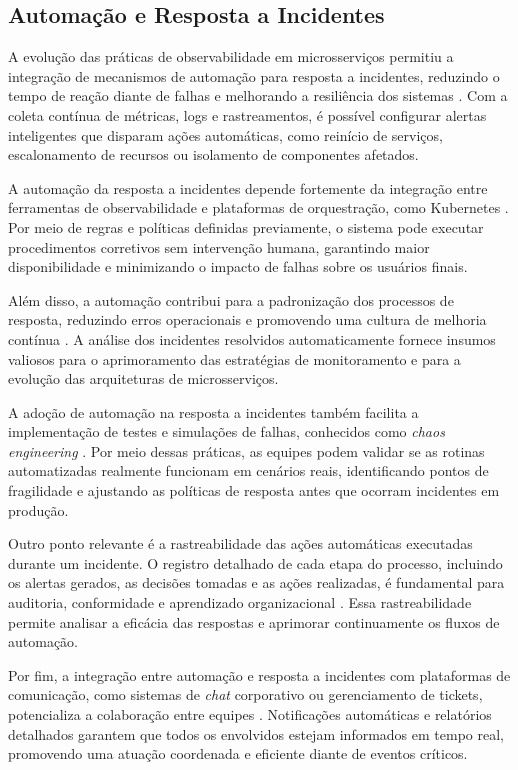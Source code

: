 \subsection{Automação e Resposta a Incidentes}

A evolução das práticas de observabilidade em microsserviços permitiu a integração de mecanismos de automação para resposta a incidentes, reduzindo o tempo de reação diante de falhas e melhorando a resiliência dos sistemas \cite{ahmed2022observability}. Com a coleta contínua de métricas, logs e rastreamentos, é possível configurar alertas inteligentes que disparam ações automáticas, como reinício de serviços, escalonamento de recursos ou isolamento de componentes afetados.

A automação da resposta a incidentes depende fortemente da integração entre ferramentas de observabilidade e plataformas de orquestração, como Kubernetes \cite{shekhar2023microservices}. Por meio de regras e políticas definidas previamente, o sistema pode executar procedimentos corretivos sem intervenção humana, garantindo maior disponibilidade e minimizando o impacto de falhas sobre os usuários finais.

Além disso, a automação contribui para a padronização dos processos de resposta, reduzindo erros operacionais e promovendo uma cultura de melhoria contínua \cite{shekhar2023microservices}. A análise dos incidentes resolvidos automaticamente fornece insumos valiosos para o aprimoramento das estratégias de monitoramento e para a evolução das arquiteturas de microsserviços.

A adoção de automação na resposta a incidentes também facilita a implementação de testes e simulações de falhas, conhecidos como \textit{chaos engineering} \cite{shekhar2023microservices}. Por meio dessas práticas, as equipes podem validar se as rotinas automatizadas realmente funcionam em cenários reais, identificando pontos de fragilidade e ajustando as políticas de resposta antes que ocorram incidentes em produção.

Outro ponto relevante é a rastreabilidade das ações automáticas executadas durante um incidente. O registro detalhado de cada etapa do processo, incluindo os alertas gerados, as decisões tomadas e as ações realizadas, é fundamental para auditoria, conformidade e aprendizado organizacional \cite{observability2023}. Essa rastreabilidade permite analisar a eficácia das respostas e aprimorar continuamente os fluxos de automação.

Por fim, a integração entre automação e resposta a incidentes com plataformas de comunicação, como sistemas de \textit{chat} corporativo ou gerenciamento de tickets, potencializa a colaboração entre equipes \cite{ahmed2022observability}. Notificações automáticas e relatórios detalhados garantem que todos os envolvidos estejam informados em tempo real, promovendo uma atuação coordenada e eficiente diante de eventos críticos.


